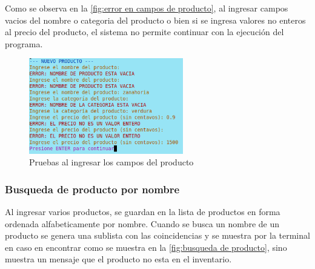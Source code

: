 \documentclass[12pt]{article}
\begin{document}
Como se observa en la \autoref{fig:error en campos de producto}, al ingresar campos vacios del nombre o categoria del producto o bien si se 
ingresa valores no enteros al precio del producto, el sistema no permite continuar con la ejecución del programa.

\begin{figure}[H]
	\centering
	\setlength{\fboxrule}{0pt}
	\includegraphics[width=0.6\textwidth]{Imagenes/errores_nuevo_producto.png}
	\caption{Pruebas al ingresar los campos del producto}
	\label{fig:error en campos de producto}
\end{figure} 


\subsubsection{Busqueda de producto por nombre}

Al ingresar varios productos, se guardan en la lista de productos en forma ordenada alfabeticamente por nombre. Cuando se busca un nombre de un producto
se genera una sublista con las coincidencias y se muestra por la terminal en caso en encontrar como se muestra en la \autoref{fig:busqueda de producto}, sino muestra un mensaje que el producto no esta en el inventario.
\end{document}
